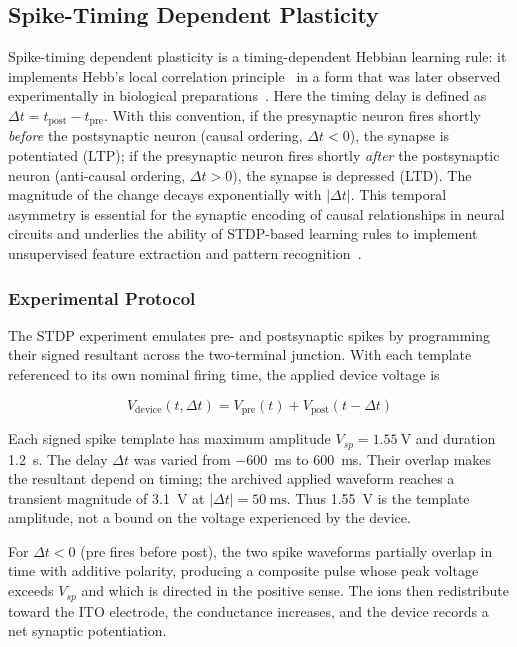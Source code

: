 \documentclass[12pt, twoside]{report}
\begin{document}
\subsection{Spike-Timing Dependent Plasticity}\label{subsec:stdp}

Spike-timing dependent plasticity is a timing-dependent Hebbian learning rule: it implements Hebb's local correlation principle~\cite{Hebb1949} in a form that was later observed experimentally in biological preparations~\cite{Markram1997, Bi1998}. Here the timing delay is defined as \(\Delta t = t_{\mathrm{post}} - t_{\mathrm{pre}}\). With this convention, if the presynaptic neuron fires shortly \textit{before} the postsynaptic neuron (causal ordering, $\Delta t < 0$), the synapse is potentiated (LTP); if the presynaptic neuron fires shortly \textit{after} the postsynaptic neuron (anti-causal ordering, $\Delta t > 0$), the synapse is depressed (LTD). The magnitude of the change decays exponentially with $|\Delta t|$. This temporal asymmetry is essential for the synaptic encoding of causal relationships in neural circuits and underlies the ability of STDP-based learning rules to implement unsupervised feature extraction and pattern recognition~\cite{Bichler2012}.

\subsubsection{Experimental Protocol}

The STDP experiment emulates pre- and postsynaptic spikes by programming their signed resultant across the two-terminal junction. With each template referenced to its own nominal firing time, the applied device voltage is

\begin{equation}
  V_{\mathrm{device}}(t,\Delta t) = V_{\mathrm{pre}}(t) + V_{\mathrm{post}}(t-\Delta t)
  \label{eq:stdp_voltage}
\end{equation}

Each signed spike template has maximum amplitude $V_{sp}=\SI{1.55}{\volt}$ and duration \SI{1.2}{\second}. The delay $\Delta t$ was varied from \SI{-600}{\milli\second} to \SI{+600}{\milli\second}. Their overlap makes the resultant depend on timing; the archived applied waveform reaches a transient magnitude of \SI{3.1}{\volt} at $|\Delta t|=\SI{50}{\milli\second}$. Thus \SI{1.55}{\volt} is the template amplitude, not a bound on the voltage experienced by the device.

For \(\Delta t < 0\) (pre fires before post), the two spike waveforms partially overlap in time with additive polarity, producing a composite pulse whose peak voltage exceeds \(V_{sp}\) and which is directed in the positive sense. The ions then redistribute toward the ITO electrode, the conductance increases, and the device records a net synaptic potentiation.
\end{document}
